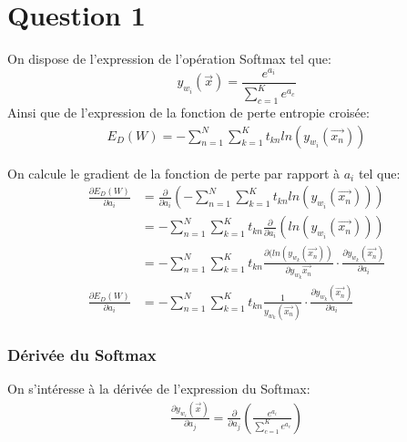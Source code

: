 \section{Question 1}
On dispose de l'expression de l'opération Softmax tel que:
\begin{equation}	
	y_{w_i}(\overrightarrow{x}) = \frac{e^{a_i}}{\sum_{c=1}^Ke^{a_c}}
\end{equation}
Ainsi que de l'expression de la fonction de perte entropie croisée:
\begin{equation}
\begin{split}
	E_D(W) = - \sum_{n=1}^N \sum_{k=1}^K t_{kn} ln (y_{w_i} (\overrightarrow{x_n}))
\end{split}
\end{equation}

On calcule le gradient de la fonction de perte par rapport à $a_i$ tel que:
\begin{equation}
\begin{split}
	\frac{\partial E_D(W)}{\partial a_i}  &= \frac{\partial}{\partial a_i} \left(-\sum_{n=1}^N \sum_{k=1}^K t_{kn} ln (y_{w_i} (\overrightarrow{x_n})) \right) \\
	&= -\sum_{n=1}^N \sum_{k=1}^K t_{kn} \frac{\partial}{\partial a_i} \left(ln (y_{w_i} (\overrightarrow{x_n})) \right) \\
	&= -\sum_{n=1}^N \sum_{k=1}^K t_{kn} \frac{\partial(ln(y_{w_k}(\overrightarrow{x_n}))}{\partial y_{w_k} \overrightarrow{x_n}} \cdot \frac{\partial y_{w_k} (\overrightarrow{x_n})}{\partial a_i} \\
	\frac{\partial E_D(W)}{\partial a_i}  &= -\sum_{n=1}^N \sum_{k=1}^K t_{kn} \frac{1}{y_{w_k} (\overrightarrow{x_n})} \cdot \frac{\partial y_{w_k} (\overrightarrow{x_n})}{\partial a_i}
\end{split}
\end{equation}

\subsubsection{Dérivée du Softmax}
On s'intéresse à la dérivée de l'expression du Softmax:
\begin{equation}
\begin{split}
	\frac{\partial y_{w_i}(\overrightarrow{x})}{\partial a_j} = \frac{\partial}{\partial a_j} \left( \frac{e^{a_i}}{\sum_{c=1}^Ke^{a_c}} \right)
\end{split}
\end{equation}

